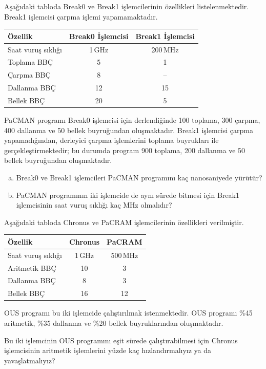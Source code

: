 \begin{alistirma}[\zor]
Aşağıdaki tabloda Break0 ve Break1 işlemcilerinin özellikleri listelenmektedir. Break1 işlemcisi çarpma işlemi yapamamaktadır.

\begin{center}
\begin{tabular}{lcc}
\toprule
\textbf{Özellik} & \textbf{Break0 İşlemcisi} & \textbf{Break1 İşlemcisi} \\
\midrule
Saat vuruş sıklığı & 1\,GHz & 200\,MHz \\
Toplama BBÇ & 5 & 1 \\
Çarpma BBÇ & 8 & -- \\
Dallanma BBÇ & 12 & 15 \\
Bellek BBÇ & 20 & 5 \\
\bottomrule
\end{tabular}
\end{center}

PaCMAN programı Break0 işlemcisi için derlendiğinde 100 toplama, 300 çarpma, 400 dallanma ve 50 bellek buyruğundan oluşmaktadır. Break1 işlemcisi çarpma yapamadığından, derleyici çarpma işlemlerini toplama buyrukları ile gerçekleştirmektedir; bu durumda program 900 toplama, 200 dallanma ve 50 bellek buyruğundan oluşmaktadır.

\begin{enumerate}[(a)]
    \item Break0 ve Break1 işlemcileri PaCMAN programını kaç nanosaniyede yürütür?
    \item PaCMAN programının iki işlemcide de aynı sürede bitmesi için Break1 işlemcisinin saat vuruş sıklığı kaç MHz olmalıdır?
\end{enumerate}
\end{alistirma}


\begin{alistirma}[\orta]
Aşağıdaki tabloda Chronus ve PaCRAM işlemcilerinin özellikleri verilmiştir.

\begin{center}
\begin{tabular}{lcc}
\toprule
\textbf{Özellik} & \textbf{Chronus} & \textbf{PaCRAM} \\
\midrule
Saat vuruş sıklığı & 1\,GHz & 500\,MHz \\
Aritmetik BBÇ & 10 & 3 \\
Dallanma BBÇ & 8 & 3 \\
Bellek BBÇ & 16 & 12 \\
\bottomrule
\end{tabular}
\end{center}

OUS programı bu iki işlemcide çalıştırılmak istenmektedir. OUS programı \%45 aritmetik, \%35 dallanma ve \%20 bellek buyruklarından oluşmaktadır.

Bu iki işlemcinin OUS programını eşit sürede çalıştırabilmesi için Chronus işlemcisinin aritmetik işlemlerini yüzde kaç hızlandırmalıyız ya da yavaşlatmalıyız?
\end{alistirma}

